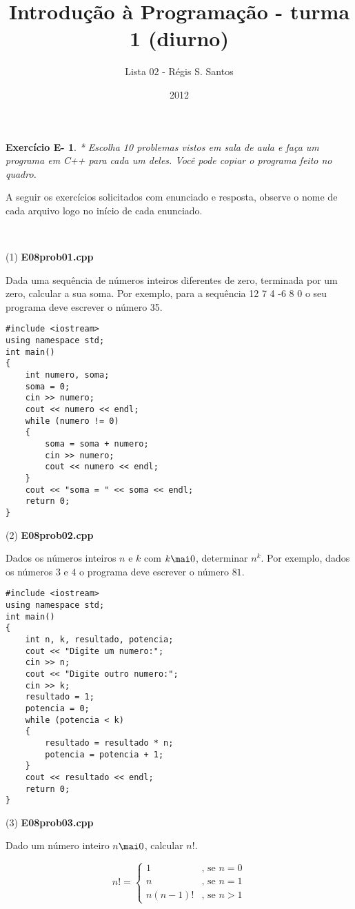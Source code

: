 \documentclass[a4paper]{article}
\title{Introdução à Programação - turma 1 (diurno)}
\author{Lista 02 - R\'egis S. Santos}
\date{2012}
\newtheorem{eex}{Exerc\'icio E-}
\begin{document}
\maketitle

\setcounter{eex}{7}
\begin{eex}
* Escolha 10 problemas vistos em sala de aula e faça um programa em C++ para cada um deles. Você pode copiar o programa feito no quadro.
\end{eex}

\begin{sol}
A seguir os exercícios solicitados com enunciado e resposta, observe o nome de cada arquivo logo no início de cada enunciado.

\

(1) \textbf{E08prob01.cpp}

Dada uma sequência de números inteiros diferentes de zero, terminada por um zero, calcular a sua soma. Por exemplo, para a sequência 12 7 4 -6 8 0 o seu programa deve escrever o número 35.

\begin{lstlisting}
#include <iostream>
using namespace std;
int main()
{
    int numero, soma;
    soma = 0;
    cin >> numero;
    cout << numero << endl;
    while (numero != 0)
    {
        soma = soma + numero;
        cin >> numero;
        cout << numero << endl;
    }
    cout << "soma = " << soma << endl;
    return 0;
}
\end{lstlisting}

(2) \textbf{E08prob02.cpp}

Dados os números inteiros $n$ e $k$ com $k \mai 0$, determinar $n^k$. Por exemplo, dados os números $3$ e $4$ o programa deve escrever o número $81$.

\begin{lstlisting}
#include <iostream>
using namespace std;
int main()
{
    int n, k, resultado, potencia;
    cout << "Digite um numero:";
    cin >> n;
    cout << "Digite outro numero:";
    cin >> k;
    resultado = 1;
    potencia = 0;
    while (potencia < k)
    {
        resultado = resultado * n;
        potencia = potencia + 1;
    }
    cout << resultado << endl;
    return 0;
}
\end{lstlisting}

(3) \textbf{E08prob03.cpp}

Dado um número inteiro $n \mai 0$, calcular $n!$.

\begin{equation*}
  n! =
  \begin{cases}
    1 		& \mbox{, se } n = 0 \\
    n 		& \mbox{, se } n = 1 \\
    n(n - 1)! 	& \mbox{, se } n > 1
  \end{cases}
\end{equation*}


\end{sol}
\end{document}
